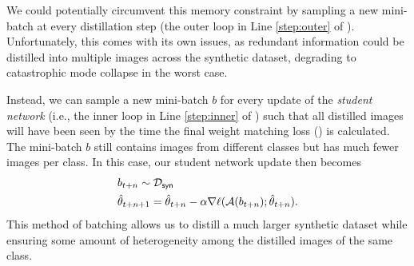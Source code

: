 We could potentially circumvent this memory constraint by sampling a new mini-batch at every distillation step (the outer loop in Line \ref{step:outer} of ). 
Unfortunately,  this comes with its own issues, as redundant information could be distilled into multiple images across the synthetic dataset, degrading to catastrophic mode collapse in the worst case.

Instead, we can sample a new mini-batch $b$ for every update of the \emph{student network} (i.e., the inner loop in  Line \ref{step:inner} of ) such that all distilled images will have been seen by the time the final weight matching loss () is calculated. The mini-batch $b$ still contains images from different classes but has much fewer images per class. In this case, our student network update then becomes%
\vspace{-5pt}\begin{equation}
\begin{split}
      & b_{t+n} \sim \mathcal{D}_\mathsf{syn}\\
    & \hat{\theta}_{t+n+1} =\hat{\theta}_{t+n} - \alpha \nabla \ell(\mathcal{A}(b_{t+n}); \hat{\theta}_{t+n}).
\end{split}\vspace{-10pt}
\end{equation}%
This method of batching allows us to distill a much larger synthetic dataset while ensuring some amount of heterogeneity among the distilled images of the same class. 





